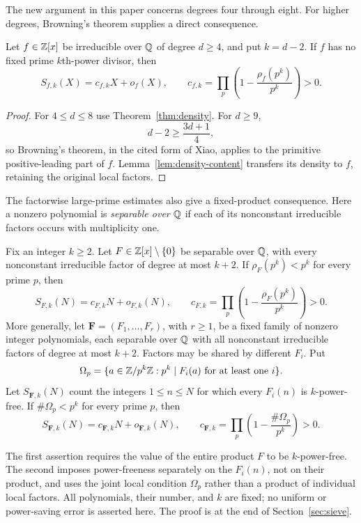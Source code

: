 The new argument in this paper concerns degrees four through eight.
For higher degrees, Browning's theorem supplies a direct consequence.

\begin{corollary}\label{cor:all-degrees}
Let $f\in\mathbb Z[x]$ be irreducible over $\mathbb Q$ of degree $d\ge4$, and
put $k=d-2$. If $f$ has no fixed prime $k$th-power divisor, then
\[
 S_{f,k}(X)=c_{f,k}X+o_f(X),\qquad
 c_{f,k}=\prod_p\left(1-\frac{\rho_f(p^k)}{p^k}\right)>0.
\]
\end{corollary}

\begin{proof}
For $4\le d\le8$ use Theorem~\ref{thm:density}. For $d\ge9$,
\[
 d-2\ge\frac{3d+1}{4},
\]
so Browning's theorem, in the cited form of Xiao, applies to the
primitive positive-leading part of $f$. Lemma~\ref{lem:density-content}
transfers its density to $f$, retaining the original local factors.
\end{proof}

The factorwise large-prime estimates also give a fixed-product
consequence. Here a nonzero polynomial is \emph{separable over $\mathbb Q$}
if each of its nonconstant irreducible factors occurs with multiplicity one.

\begin{corollary}
\label{cor:separable-products}
Fix an integer $k\ge2$. Let $F\in\mathbb Z[x]\setminus\{0\}$ be separable over
$\mathbb Q$, with every nonconstant irreducible factor of degree at most $k+2$.
If $\rho_F(p^k)<p^k$ for every prime $p$, then
\[
 S_{F,k}(N)=c_{F,k}N+o_{F,k}(N),\qquad
 c_{F,k}=\prod_p\left(1-\frac{\rho_F(p^k)}{p^k}\right)>0.
\]
More generally, let $\mathbf F=(F_1,\ldots,F_r)$, with $r\ge1$, be a fixed
family of nonzero integer polynomials, each separable over $\mathbb Q$ with all
nonconstant irreducible factors of degree at most $k+2$. Factors may be
shared by different $F_i$. Put
\[
 \Omega_p=\{a\in\mathbb Z/p^k\mathbb Z:p^k\mid F_i(a)\text{ for at least one }i\}.
\]
Let $S_{\mathbf F,k}(N)$ count the integers $1\le n\le N$ for which every
$F_i(n)$ is $k$-power-free. If $\#\Omega_p<p^k$ for every prime $p$, then
\[
 S_{\mathbf F,k}(N)=c_{\mathbf F,k}N+o_{\mathbf F,k}(N),\qquad
 c_{\mathbf F,k}=\prod_p\left(1-\frac{\#\Omega_p}{p^k}\right)>0.
\]
\end{corollary}

The first assertion requires the value of the entire product $F$ to be
$k$-power-free. The second imposes power-freeness separately on the
$F_i(n)$, not on their product, and uses the joint local condition
$\Omega_p$ rather than a product of individual local factors.
All polynomials, their number, and $k$ are fixed; no uniform or
power-saving error is asserted here. The proof is at the end of
Section~\ref{sec:sieve}.

